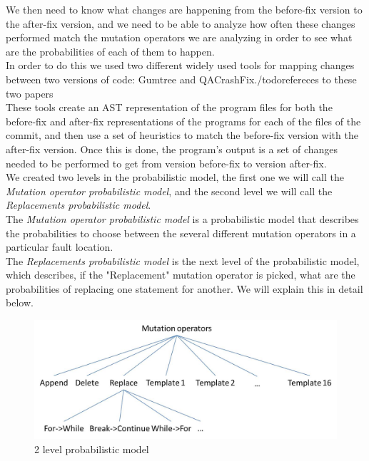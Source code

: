 \documentclass[conference]{IEEEtran}
\begin{document}
{{We then need to know what changes are happening from the before-fix version to the after-fix version, and we need to be able to analyze how often these changes performed match the mutation operators we are analyzing in order to see what are the probabilities of each of them to happen.\\
In order to do this we used two different widely used tools for mapping changes between two versions of code: Gumtree and QACrashFix./todo{refereces to these two papers}\\
These tools create an AST representation of the program files for both the before-fix and after-fix representations of the programs for each of the files of the commit, and then use a set of heuristics to match the before-fix version with the after-fix version. Once this is done, the program's output is a set of changes needed to be performed to get from version before-fix to version after-fix.\\
We created two levels in the probabilistic model, the first one we will call the \textit{Mutation operator probabilistic model}, and the second level we will call the \textit{Replacements probabilistic model}.\\
The \textit{Mutation operator probabilistic model} is a probabilistic model that describes the probabilities to choose between the several different mutation operators in a particular fault location.\\
The \textit{Replacements probabilistic model} is the next level of the probabilistic model, which describes, if the "Replacement" mutation operator is picked, what are the probabilities of replacing one statement for another. We will explain this in detail below.\\

\begin{figure}[!h]
  \centering
    \includegraphics[scale=0.4]{Picture2}
  \caption{2 level probabilistic model}
  \label{fig:probModel}
\end{figure}

}}
\end{document}

